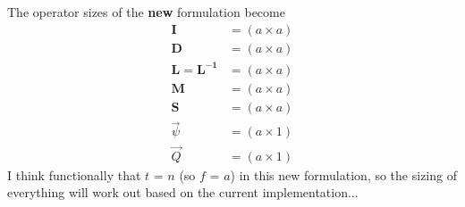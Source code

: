 \documentclass[12pt,twoside]{article}
\newcommand{\ve}[1]{\ensuremath{\mathbf{#1}}}
\begin{document}
The operator sizes of the \textbf{new} formulation become
\begin{align*}
\ve{I} &= (a \times a) \\
\ve{D} &= (a \times a) \\
\ve{L} = \ve{L^{-1}} &= (a \times a) \\
\ve{M} &= (a \times a) \\
\ve{S} &= (a \times a) \\
\vec{\psi} &= (a \times 1) \\
\vec{Q} &= (a \times 1)
\end{align*}
I think functionally that $t$ = $n$ (so $f$ = $a$) in this new formulation, so the sizing of everything will work out based on the current implementation...
\end{document}
